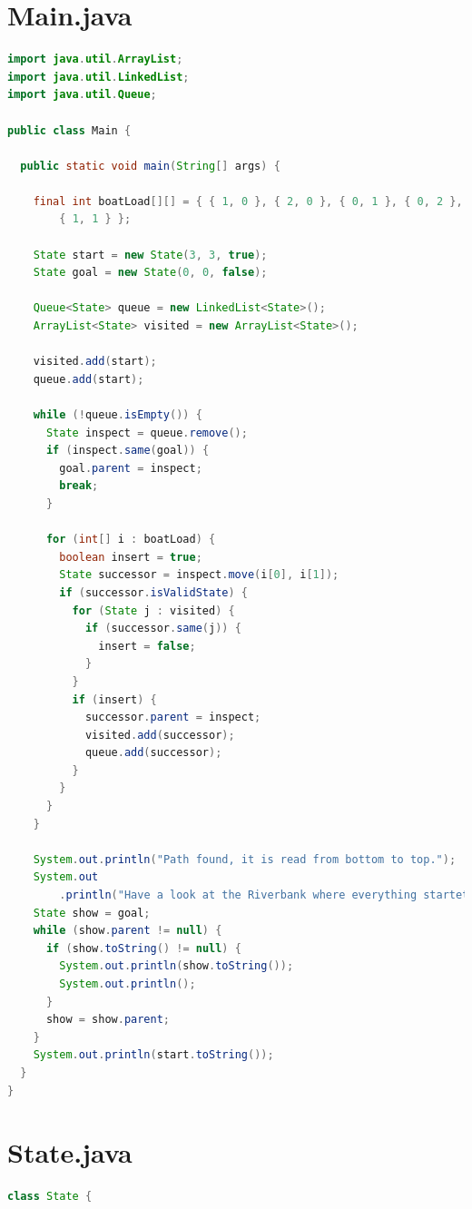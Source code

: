 \documentclass{scrreprt}
\begin{document}
\newpage
\begin{appendices} 
\chapter{Main.java}
\begin{lstlisting}[language=Java]
import java.util.ArrayList;
import java.util.LinkedList;
import java.util.Queue;

public class Main {

  public static void main(String[] args) {

    final int boatLoad[][] = { { 1, 0 }, { 2, 0 }, { 0, 1 }, { 0, 2 },
        { 1, 1 } };

    State start = new State(3, 3, true);
    State goal = new State(0, 0, false);

    Queue<State> queue = new LinkedList<State>();
    ArrayList<State> visited = new ArrayList<State>();

    visited.add(start);
    queue.add(start);

    while (!queue.isEmpty()) {
      State inspect = queue.remove();
      if (inspect.same(goal)) {
        goal.parent = inspect;
        break;
      }

      for (int[] i : boatLoad) {
        boolean insert = true;
        State successor = inspect.move(i[0], i[1]);
        if (successor.isValidState) {
          for (State j : visited) {
            if (successor.same(j)) {
              insert = false;
            }
          }
          if (insert) {
            successor.parent = inspect;
            visited.add(successor);
            queue.add(successor);
          }
        }
      }
    }

    System.out.println("Path found, it is read from bottom to top.");
    System.out
        .println("Have a look at the Riverbank where everything startet:");
    State show = goal;
    while (show.parent != null) {
      if (show.toString() != null) {
        System.out.println(show.toString());
        System.out.println();
      }
      show = show.parent;
    }
    System.out.println(start.toString());
  }
}

\end{lstlisting}
\newpage
\chapter{State.java}
\begin{lstlisting}[language=Java]
class State {


\end{lstlisting}
\end{appendices}
\end{document}
